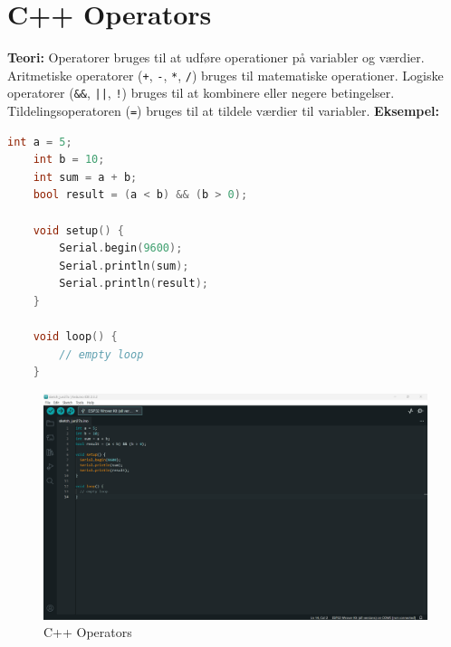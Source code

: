 \section{C++ Operators}
\textbf{Teori:} Operatorer bruges til at udføre operationer på variabler og værdier. Aritmetiske operatorer (\texttt{+}, \texttt{-}, \texttt{*}, \texttt{/}) bruges til matematiske operationer. Logiske operatorer (\texttt{\&\&}, \texttt{||}, \texttt{!}) bruges til at kombinere eller negere betingelser. Tildelingsoperatoren (\texttt{=}) bruges til at tildele værdier til variabler.
\newline\newline
\noindent\textbf{Eksempel:}
\begin{lstlisting}[language=C++]
	int a = 5;
	int b = 10;
	int sum = a + b;
	bool result = (a < b) && (b > 0);
	
	void setup() {
		Serial.begin(9600);
		Serial.println(sum);
		Serial.println(result);
	}
	
	void loop() {
		// empty loop
	}
\end{lstlisting}
\begin{figure}[h!]
	\centering
	\includegraphics[width=\textwidth]{fig/fig6.png}
	\caption{C++ Operators}
	\label{fig:6}
\end{figure}

